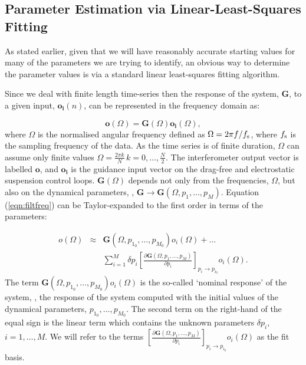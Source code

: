 
\subsection{Parameter Estimation via Linear-Least-Squares Fitting}
\label{sec:linearfit_param_est}

As stated earlier, given that we will have reasonably accurate starting values for many of the
parameters we are trying to identify, an obvious way to determine the parameter
values is via a standard linear least-squares fitting algorithm.

Since we deal with finite length time-series then the response of the system, $\mathbf{G}$,
to a given input, $\mathbf{o_i}\left(n\right)$, can be represented in
the frequency domain as:

\begin{equation} 	
\mathbf{o}\left(\Omega\right) = \mathbf{G}\left(\Omega\right) \mathbf{o_i}\left(\Omega\right),
	\label{eqn:filtfreq} 
\end{equation} 
where $\Omega$ is the normalised angular frequency defined as $\Omega = 2 \pi f /
f_{\rm s}$, where $f_{\rm s}$ is the sampling frequency of the data. As the time
series is of finite duration, $\Omega$ can assume only finite values $\Omega =
\frac{2 \pi k}{N} \, k = 0, \ldots, \frac{N}{2}$.  The interferometer output vector
is labelled $\mathbf{o}$, and $\mathbf{o_i}$ is the guidance input vector on
the drag-free and electrostatic suspension control loops. $\mathbf{G}\left(\Omega\right)$
depends not only from the frequencies, $\Omega$, but also on the dynamical
parameters, \ie, $\mathbf{G} \rightarrow \mathbf{G}\left(\Omega, p_1, \ldots,
p_M\right)$. Equation (\ref{eqn:filtfreq}) can be Taylor-expanded to the first
order in terms of the parameters:

\begin{eqnarray}
	o\left(\Omega\right) &\approx& \mathbf{G}\left(\Omega, p_{1_0}, \ldots, p_{M_0}\right) o_i\left(\Omega\right) + \ldots \nonumber\\
&& \sum_{i=1}^{M} \delta p_i \left[\frac{\partial \mathbf{G}\left(\Omega, p_{1}, \ldots, p_{M}\right)}{\partial p_i}\right]_{p_i \rightarrow p_{i_0}} o_i\left(\Omega\right).
	\label{eqn:Taylor}
\end{eqnarray}
The term  $\mathbf{G}\left(\Omega, p_{1_0}, \ldots, p_{M_0}\right) o_i\left(\Omega\right)$
is the so-called `nominal response' of the system, \ie, the response of the
system computed with the initial values of the dynamical parameters,
$p_{1_0}, \ldots, p_{M_0}$. The second term on the right-hand of the equal sign
is the linear term which contains the unknown parameters $\delta p_i$, $i = 1, \ldots,
M$. We will refer to the terms $\left[\frac{\partial \mathbf{G}\left(\Omega,
p_{1}, \ldots, p_{M}\right)}{\partial p_i}\right]_{p_i \rightarrow p_{i_0}} o_i\left(\Omega\right)$
as the fit basis.

